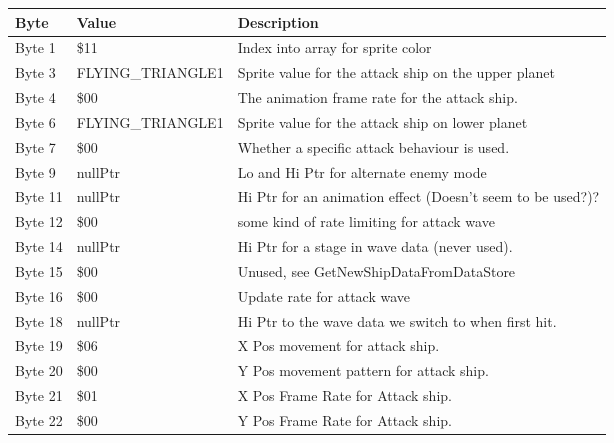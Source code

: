 \begin{figure}[H]
{\begin{adjustbox}{width=12cm}
\begin{tabular}{lll}
\toprule
 Byte    & Value                     & Description                                                        \\
\midrule
 Byte 1  & \$11                       & Index into array for sprite color                                  \\
 Byte 3  & FLYING\_TRIANGLE1          & Sprite value for the attack ship on the upper planet               \\
 Byte 4  & \$00                       & The animation frame rate for the attack ship.                      \\
 Byte 6  & FLYING\_TRIANGLE1          & Sprite value for the attack ship on lower planet                   \\
 Byte 7  & \$00                       & Whether a specific attack behaviour is used.                       \\
 Byte 9  & nullPtr                   & Lo and Hi Ptr for alternate enemy mode                             \\
 Byte 11 & nullPtr                   & Hi Ptr for an animation effect (Doesn't seem to be used?)?         \\
 Byte 12 & \$00                       & some kind of rate limiting for attack wave                         \\
 Byte 14 & nullPtr                   & Hi Ptr for a stage in wave data (never used).                      \\
 Byte 15 & \$00                       & Unused, see GetNewShipDataFromDataStore                            \\
 Byte 16 & \$00                       & Update rate for attack wave                                        \\
 Byte 18 & nullPtr                   & Hi Ptr to the wave data we switch to when first hit.               \\
 Byte 19 & \$06                       & X Pos movement for attack ship.                                    \\
 Byte 20 & \$00                       & Y Pos movement pattern for attack ship.                            \\
 Byte 21 & \$01                       & X Pos Frame Rate for Attack ship.                                  \\
 Byte 22 & \$00                       & Y Pos Frame Rate for Attack ship.                                  \\

\end{tabular}
\end{adjustbox}}
\end{figure}
